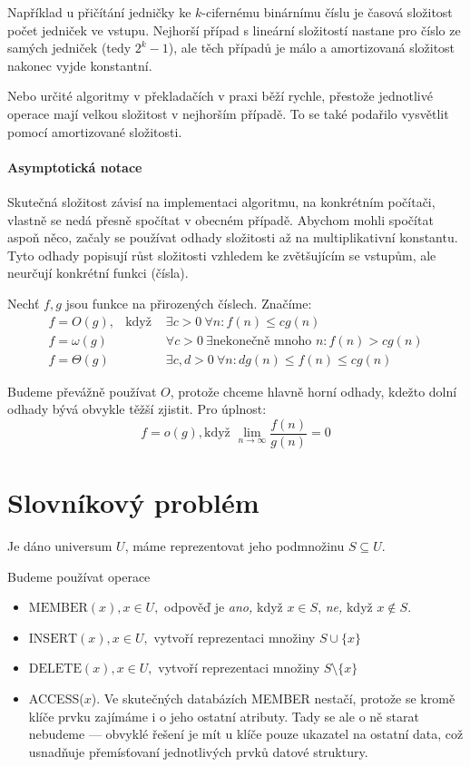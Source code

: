 Například u přičítání jedničky ke $k$-cifernému binárnímu číslu je
časová složitost počet jedniček ve vstupu. Nejhorší případ s lineární
složitostí nastane pro číslo ze samých jedniček (tedy $2^k-1$), ale
těch případů je málo a amortizovaná složitost nakonec vyjde
konstantní.

Nebo určité algoritmy v překladačích v praxi běží rychle, přestože
jednotlivé operace mají velkou složitost v nejhorším případě. 
To se také podařilo vysvětlit pomocí amortizované složitosti.

\subsubsection{Asymptotická notace}

Skutečná složitost závisí na implementaci algoritmu, na konkrétním
počítači, vlastně se nedá přesně spočítat v obecném případě. Abychom 
mohli spočítat aspoň něco, začaly se používat odhady složitosti až 
na multiplikativní konstantu. Tyto odhady popisují růst složitosti 
vzhledem ke zvětšujícím se vstupům, ale neurčují konkrétní funkci 
(čísla). 

Nechť $f, g$ jsou funkce na přirozených číslech. Značíme:
\begin{eqnarray}
f = O(g),	&\text{když }
	&\exists c>0 \ \forall n: f(n) \leq c g(n) \\
f = \omega(g)	&
	&\forall c>0 \ \exists \text{nekonečně mnoho }n: f(n) > c g(n)\\
f = \Theta(g)	&
	&\exists c,d>0 \ \forall n: d g(n) \leq f(n) \leq c g(n)
\end{eqnarray}

Budeme převážně používat $O$, protože chceme hlavně horní odhady, kdežto dolní
odhady bývá obvykle těžší zjistit. Pro úplnost:
\[ f=o(g), \text{když } \lim_{n \to \infty} \frac{f(n)}{g(n)} = 0 \]


\chapter{Slovníkový problém}

Je dáno universum $U$, máme reprezentovat jeho podmnožinu $S \subseteq
U$.

\newcommand{\MEMBER}{\text{MEMBER}}
\newcommand{\INSERT}{\text{INSERT}}
\newcommand{\DELETE}{\text{DELETE}}
Budeme používat operace
\begin{itemize}
\item $\MEMBER(x), x \in U,$ 
	odpověď je {\em ano,} když $x \in S$, {\em ne,} když $x \notin S$.
\item $\INSERT(x), x \in U,$ 
	vytvoří reprezentaci množiny $S \cup \{x\}$
\item $\DELETE(x), x \in U,$ 
	vytvoří reprezentaci množiny $S \setminus \{x\}$
\item ACCESS($x$). Ve skutečných databázích MEMBER nestačí, protože se
kromě klíče prvku zajímáme i o jeho ostatní atributy. Tady se ale o ně
starat nebudeme --- obvyklé řešení je mít u klíče pouze ukazatel na
ostatní data, což usnadňuje přemísťovaní jednotlivých prvků datové struktury.
\end{itemize}

